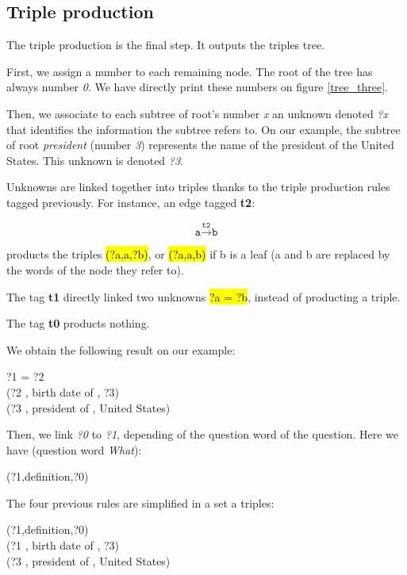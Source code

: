 
\subsection{Triple production}

The triple production is the final step. It outputs the triples tree.

First, we assign a number to each remaining node. The root of the tree has always number \textit{0}. We have directly print these numbers on figure \ref{tree_three}.

Then, we associate to each subtree of root's number \textit{x} an unknown denoted \textit{?x} that identifies the information the subtree refers to. On our example, the subtree of root \textit{president} (number \textit{3}) represents the name of the president of the United States. This unknown is denoted \textit{?3}.

Unknowns are linked together into triples thanks to the triple production rules tagged previously. For instance, an  edge tagged \textbf{t2}:

\[\texttt{a}\xrightarrow{\texttt{t2}}\texttt{b}\]

products the triples \hl{(?a,a,?b)}, or \hl{(?a,a,b)} if b is a leaf (a and b are replaced by the words of the node they refer to).

The tag \textbf{t1} directly linked two unknowns \hl{?a = ?b}, instead of producting a triple.

The tag \textbf{t0} products nothing.

We obtain the following result on our example:

\begin{center}
 ?1 = ?2 ~\\
 (?2 , birth date of , ?3) ~\\
 (?3 , president of , United States)
\end{center}

Then, we link \textit{?0} to \textit{?1}, depending of the question word of the question. Here we have (question word \textit{What}):
\begin{center}
 (?1,definition,?0)
\end{center}

The four previous rules are simplified in a set a triples:

\begin{center}
 (?1,definition,?0) ~\\
 (?1 , birth date of , ?3) ~\\
 (?3 , president of , United States)
\end{center}

